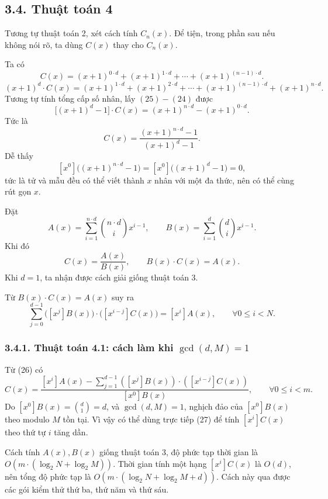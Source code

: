 \documentclass[11pt]{article}
\begin{document}
\subsection*{3.4. Thuật toán 4}

Tương tự thuật toán 2, xét cách tính \(C_n(x)\). Để tiện, trong phần sau nếu
không nói rõ, ta dùng \(C(x)\) thay cho \(C_n(x)\).

Ta có
\begin{equation*}
  C(x)=(x+1)^{0\cdot d}+(x+1)^{1\cdot d}+\cdots+(x+1)^{(n-1)\cdot d}.
  \tag{24}
\end{equation*}
\begin{equation*}
  (x+1)^d\cdot C(x)=(x+1)^{1\cdot d}+(x+1)^{2\cdot d}
  +\cdots+(x+1)^{(n-1)\cdot d}+(x+1)^{n\cdot d}.
  \tag{25}
\end{equation*}
Tương tự tính tổng cấp số nhân, lấy \((25)-(24)\) được
\[
  \bigl[(x+1)^d-1\bigr]\cdot C(x)=(x+1)^{n\cdot d}-(x+1)^{0\cdot d}.
\]
Tức là
\[
  C(x)=\frac{(x+1)^{n\cdot d}-1}{(x+1)^d-1}.
\]
Dễ thấy
\[
  [x^0]\bigl((x+1)^{n\cdot d}-1\bigr)
  =[x^0]\bigl((x+1)^d-1\bigr)=0,
\]
tức là tử và mẫu đều có thể viết thành \(x\) nhân với một đa thức, nên có thể
cùng rút gọn \(x\).

Đặt
\[
  A(x)=\sum_{i=1}^{n\cdot d}\binom{n\cdot d}{i}x^{i-1},\qquad
  B(x)=\sum_{i=1}^{d}\binom{d}{i}x^{i-1}.
\]
Khi đó
\[
  C(x)=\frac{A(x)}{B(x)},\qquad B(x)\cdot C(x)=A(x).
\]
Khi \(d=1\), ta nhận được cách giải giống thuật toán 3.

Từ \(B(x)\cdot C(x)=A(x)\) suy ra
\begin{equation*}
  \sum_{j=0}^{d-1}\bigl([x^j]B(x)\bigr)\cdot
  \bigl([x^{i-j}]C(x)\bigr)=[x^i]A(x),
  \qquad \forall 0\le i<N.
  \tag{26}
\end{equation*}

\subsubsection*{3.4.1. Thuật toán 4.1: cách làm khi \(\gcd(d,M)=1\)}

Từ (26) có
\begin{equation*}
  [x^i]C(x)=
  \frac{[x^i]A(x)-\sum_{j=1}^{d-1}([x^j]B(x))\cdot([x^{i-j}]C(x))}
       {[x^0]B(x)},\qquad \forall 0\le i<m.
  \tag{27}
\end{equation*}
Do \([x^0]B(x)=\binom{d}{1}=d\), và \(\gcd(d,M)=1\), nghịch đảo của
\([x^0]B(x)\) theo modulo \(M\) tồn tại. Vì vậy có thể dùng trực tiếp (27) để
tính \([x^i]C(x)\) theo thứ tự \(i\) tăng dần.

Cách tính \(A(x),B(x)\) giống thuật toán 3, độ phức tạp thời gian là
\(O(m\cdot(\log_2 N+\log_2 M))\). Thời gian tính một hạng \([x^i]C(x)\) là
\(O(d)\), nên tổng độ phức tạp là
\(O(m\cdot(\log_2 N+\log_2 M+d))\). Cách này qua được các gói kiểm thử thứ ba,
thứ năm và thứ sáu.
\end{document}
